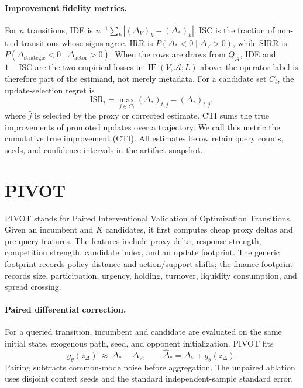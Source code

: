 \documentclass{article} %
\newcommand{\dproxy}{\Delta_V}
\newcommand{\dtrue}{\Delta_*}
\begin{document}
\paragraph{Improvement fidelity metrics.}
For $n$ transitions, IDE is
$n^{-1}\sum_k|(\dproxy)_k-(\dtrue)_k|$. ISC is the fraction of non-tied
transitions whose signs agree. IRR is
$P(\dtrue<0\mid\dproxy>0)$, while SIRR is
$P(\Delta_{\mathrm{strategic}}<0\mid\Delta_{\mathrm{actor}}>0)$.
When the rows are draws from $Q_{\mathcal A}$, IDE and $1-\mathrm{ISC}$ are
the two empirical losses in $\operatorname{IF}(V,\mathcal A;L)$ above; the
operator label is therefore part of the estimand, not merely metadata.
For a candidate set $C_t$, the update-selection regret is
\begin{equation}
 \mathrm{ISR}_t=\max_{j\in C_t}(\dtrue)_{t,j}-(\dtrue)_{t,\hat j},
\end{equation}
where $\hat j$ is selected by the proxy or corrected estimate. CTI sums the
true improvements of promoted updates over a trajectory. We call this metric
the cumulative true improvement (CTI). All estimates below
retain query counts, seeds, and confidence intervals in the artifact snapshot.

\section{PIVOT}
PIVOT stands for Paired Interventional Validation of Optimization
Transitions. Given an incumbent and $K$ candidates, it first computes cheap
proxy deltas and pre-query features. The features include proxy delta,
response strength, competition strength, candidate index, and an update
footprint. The generic footprint records policy-distance and action/support
shifts; the finance footprint records size, participation, urgency, holding,
turnover, liquidity consumption, and spread crossing.

\paragraph{Paired differential correction.}
For a queried transition, incumbent and candidate are evaluated on the same
initial state, exogenous path, seed, and opponent initialization. PIVOT fits
\begin{equation}
 g_\theta(z_\Delta)\ \approx\ \Delta_* - \Delta_V,
 \qquad \widehat\Delta_* = \Delta_V+g_\theta(z_\Delta).
\end{equation}
Pairing subtracts common-mode noise before aggregation. The unpaired ablation
uses disjoint context seeds and the standard independent-sample standard error.
\end{document}
